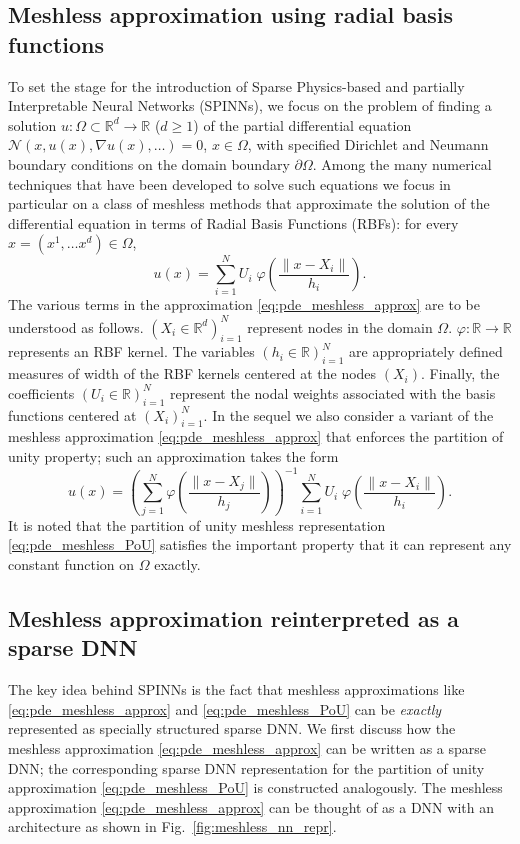\documentclass[12pt]{article}
\newcommand{\rR}[1]{#1}
\begin{document}
\subsection{Meshless approximation using radial basis functions}
To set the stage for the introduction of Sparse Physics-based \rR{and partially} Interpretable Neural Networks (SPINNs), we focus on the problem of finding a solution $u:\Omega \subset \mathbb{R}^d \to \mathbb{R}$ ($d \ge 1$) of the partial differential equation $\mathcal{N}(x, u(x), \nabla u(x), \ldots) = 0$, $x \in \Omega$, with specified Dirichlet and Neumann boundary conditions on the domain boundary $\partial \Omega$. Among the many numerical techniques that have been developed to solve such equations we focus in particular on a class of meshless methods that approximate the solution of the differential equation in terms of Radial Basis Functions (RBFs): for every $x = (x^1, \ldots x^d) \in \Omega$,
\begin{equation} \label{eq:pde_meshless_approx}
u(x) = \sum_{i=1}^N U_i \; \varphi\left(\frac{\lVert x - X_i \rVert}{h_i}\right).
\end{equation}
The various terms in the approximation \eqref{eq:pde_meshless_approx} are to be understood as follows. $(X_i \in \mathbb{R}^d)_{i=1}^N$ represent nodes in the domain $\Omega$. $\varphi:\mathbb{R}\to \mathbb{R}$ represents an RBF kernel. The variables $(h_i \in \mathbb{R})_{i=1}^N$ are appropriately defined measures of width of the RBF kernels centered at the nodes $(X_i)$. Finally, the coefficients $(U_i \in \mathbb{R})_{i=1}^N$ represent the nodal weights associated with the basis functions centered at $(X_i)_{i=1}^N$. In the sequel we also consider a variant of the meshless approximation \eqref{eq:pde_meshless_approx} that enforces the partition of unity property; such an approximation takes the form
\begin{equation} \label{eq:pde_meshless_PoU}
u(x) = \left(\sum_{j=1}^N \varphi\left(\frac{\lVert x - X_j \rVert}{h_j}\right)\right)^{-1}\sum_{i=1}^N U_i  \; \varphi\left(\frac{\lVert x - X_i \rVert}{h_i}\right).
\end{equation}
It is noted that the partition of unity meshless representation \eqref{eq:pde_meshless_PoU} satisfies the important property that it can represent any constant function on $\Omega$ exactly.

\subsection{Meshless approximation reinterpreted as a sparse DNN}
The key idea behind SPINNs is the fact that meshless approximations like \eqref{eq:pde_meshless_approx} and \eqref{eq:pde_meshless_PoU} can be \emph{exactly} represented as specially structured sparse DNN. We first discuss how the meshless approximation \eqref{eq:pde_meshless_approx} can be written as a sparse DNN; the corresponding sparse DNN representation for the partition of unity approximation \eqref{eq:pde_meshless_PoU} is constructed analogously. The meshless approximation \eqref{eq:pde_meshless_approx} can be thought of as a DNN with an architecture as shown in Fig.~\ref{fig:meshless_nn_repr}.
\end{document}
